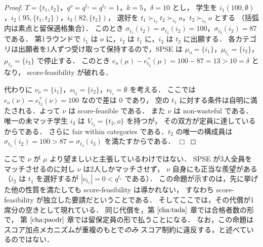 \documentclass[
    12pt,          %
    a4paper,       %
    oneside,       %
    onecolumn,     %
    titlepage,     %
    final          %
]{jreport} %
\makeatletter
\renewcommand{\chapter}{
    \if@openright\cleardoublepage\else\clearpage\fi
    \global\@topnum\z@
    \secdef\@chapter\@schapter
}
\newcommand{\refchapter}[1]{第 $\ref{#1}$ 章}
\newtheorem{definition}{定義}[chapter]
\newtheorem{proof}{証明}[chapter]
\newcommand{\qed}{\hfill $\Box$ \par}
\makeatother
\begin{document}
\begin{proof}
$T=\{t_1,t_2\}$，$q^o=q^{t_1}=q^{t_2}=1$，$k=5$，$\delta=10$ とし，
学生を $i_1(100,\emptyset)$，$i_2(95,\{t_1,t_2\})$，$i_3(82,\{t_2\})$，
選好を $t_1\succ_{i_2}t_2\succ_{i_2}o$，$t_2\succ_{i_3}o$ とする
（括弧内は素点と留保適格集合）．
このとき $\sigma_{t_1}(i_2)=\sigma_{t_2}(i_2)=100$，$\sigma_{t_2}(i_3)=87$ である．
第1ラウンドで $i_1$ は $o$ に，$i_2$ は $t_1$ に，$i_3$ は $t_2$ に出願する．
各カテゴリは出願者を1人ずつ受け取って保持するので，SPSE は
$\mu_o=\{i_1\}$，$\mu_{t_1}=\{i_2\}$，$\mu_{t_2}=\{i_3\}$ で停止する．
このとき $e_o(\mu)-e_{t_2}^+(\mu)=100-87=13>10=\delta$ となり，
score-feasibility が破れる．

代わりに $\nu_o=\{i_1\}$，$\nu_{t_2}=\{i_2\}$，$\nu_{t_1}=\emptyset$ を考える．
ここでは $e_o(\nu)=e_{t_2}^+(\nu)=100$ なので差は $0$ であり，
空の $t_1$ に対する条件は自明に満たされる．よって $\nu$ は score-feasible である．
また $\nu$ は non-wasteful である．唯一の未マッチ学生 $i_3$ は $V_{i_3}=\{t_2,o\}$ を持つが，
その双方が定員に達しているからである．
さらに fair within categories である．$t_2$ の唯一の構成員は
$\sigma_{t_2}(i_2)=100>87=\sigma_{t_2}(i_3)$ を満たすからである．
\qed
\end{proof}

ここで $\nu$ が $\mu$ より望ましいと主張しているわけではない．
SPSE が3人全員をマッチさせるのに対し $\nu$ は2人しかマッチさせず，
$\nu$ 自身にも正当な羨望がある（$i_2$ は $t_1$ を選好するが $|\nu_{t_1}|=0<q^{t_1}$ である）．
この命題が示すのは，先に挙げた他の性質を満たしても score-feasibility は導かれない，
すなわち score-feasibility が独立した要請だということである．
そしてここでは，その代償が1席分の空きとして現れている．
同じ代償を，\refchapter{cha:tada}では合格者数の形で，
\refchapter{cha:paodr}では留保定員の形で払うことになる．
なお，この命題はスコア加点メカニズムが重複のもとで\emph{のみ}
スコア制約に違反する，と述べているのではない．



\end{document}
